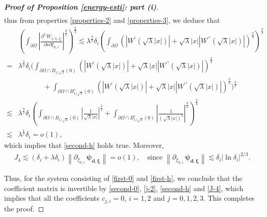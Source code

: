 \documentclass[a4paper,reqno,11pt,oneside]{amsart}
\numberwithin{equation}{section}
\begin{document}
\begin{proof}[\textbf{Proof of Proposition \eqref{energy-esti}: part (i)}]
\begin{align*}
\end{align*}
thus from properties \eqref{properties-2} and \eqref{properties-3}, we deduce that
\begin{align*}
    &\left(\displaystyle\int_{\partial\Omega}\left|\frac{\partial^2\,W_{\lambda,\delta_i,\xi_i}}{\partial{\nu}\partial \xi_{h,i}}\right|^{\frac{3}{2}}\right)^{\frac{2}{3}}\lesssim\lambda^{\frac{3}{2}}\delta_i\left(\displaystyle\int_{\partial\Omega}\left(\left|W^{\prime}(\sqrt{\lambda}|x|)\right|+\sqrt{\lambda}|x|\left|W^{\prime\prime}(\sqrt{\lambda}|x|)\right|\right)^{\frac{3}{2}}\right)^{\frac{2}{3}}\\=&\lambda^{\frac{3}{2}}\delta_i\Bigg(\displaystyle\int_{\partial\Omega\cap B_{1/\sqrt{\lambda}}(0)}\left(\left|W^{\prime}(\sqrt{\lambda}|x|)\right|+\sqrt{\lambda}|x|\left|W^{\prime\prime}(\sqrt{\lambda}|x|)\right|\right)^{\frac{3}{2}}\\&\qquad\,\,\,\quad+\displaystyle\int_{\partial\Omega\cap B^{c}_{1/\sqrt{\lambda}}(0)}\left(\left|W^{\prime}(\sqrt{\lambda}|x|)\right|+\sqrt{\lambda}|x|\left|W^{\prime\prime}(\sqrt{\lambda}|x|)\right|\right)^{\frac{3}{2}}\Bigg)^{\frac{2}{3}}\\
    \lesssim&\lambda^{\frac{3}{2}}\delta_i\left(\displaystyle\int_{\partial\Omega\cap B_{1/\sqrt{\lambda}}(0)}\left|\frac{1}{\sqrt{\lambda}|x|}\right|^{\frac{3}2}+\displaystyle\int_{\partial\Omega\cap B^{c}_{1/\sqrt{\lambda}}(0)}\left|\frac{1}{(\sqrt{\lambda}|x|)^3}\right|^{\frac{3}2}\right)^{\frac{2}{3}}\\
    \lesssim&\lambda^{\frac{1}{2}}\delta_i=o(1),
\end{align*}
which implies that \eqref{second-h} holds true. Moreover,
 \begin{align}\label{J-4}
    J_{4}\lesssim\left(\delta_i+\lambda\delta_i\right)\left\|\partial_{\xi_{h,i}}\,\bm{\psi}_{{{\bm{d},\bm{\xi}}}}\right\|=o(1),\quad\text{since $\left\|\partial_{\xi_{h,i}}\,\bm{\psi}_{{{\bm{d},\bm{\xi}}}}\right\|\lesssim \delta_i|\ln{\delta_i}|^{2/3}$.}
\end{align}


Thus, for the system consisting of \eqref{first-0} and \eqref{first-h},  we conclude that the coefficient matrix is invertible by \eqref{second-0}, \eqref{j-2}, \eqref{second-h} and \eqref{J-4}, which implies that all the coefficients $c_{j,i}=0$, $i=1,2$ and $j=0,1,2,3$. This completes the proof.
\end{proof}




\end{document}
